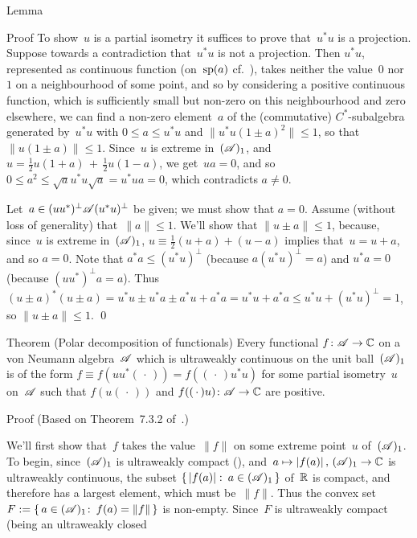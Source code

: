 \documentclass[a]{subfiles}
\begin{document}
\begin{parsec}
\begin{point}{Lemma}
\begin{point}{Proof}
To show~$u$ is a partial isometry
it suffices to prove that~$u^*u$ is a projection.
Suppose towards a contradiction that~$u^*u$ is not a projection.
Then $u^*u$,
represented
as continuous function (on~$\mathrm{sp}(a)$ cf.~),
takes neither the value~$0$ nor~$1$ on a neighbourhood
of some point,
and so by considering a
positive continuous function,
which is sufficiently small but non-zero on this neighbourhood
and zero elsewhere, 
we can find a non-zero element~$a$ 
of the (commutative) $C^*$-subalgebra generated by~$u^*u$
with $0\leq a\leq u^*u$
and $\|u^*u (1\pm a)^2\|\leq 1$,
so that~$\|u(1\pm a)\|\leq 1$.
Since~$u$ is extreme in~$(\mathscr{A})_1$,
and~$u=\frac{1}{2}u(1+a)\,+\,\frac{1}{2}u(1-a)$,
we get~$ua=0$,
and so $0\leq a^2\leq \sqrt{a}u^*u\sqrt{a}=u^*ua=0$,
which contradicts $a\neq 0$.

Let~$a\in (uu^*)^\perp \mathscr{A} (u^*u)^\perp$
be given; we must show that $a=0$.
Assume (without loss of generality)
that~$\|a\|\leq 1$.
We'll show that $\|u\pm a\|\leq 1$,
because,
since~$u$ is extreme in~$(\mathscr{A})_1$,
$u\equiv \frac{1}{2}(u+a)+(u-a)$
implies that~$u=u+a$, and so $a=0$.
Note that $a^*a \leq (u^*u)^\perp$ (because $a(u^*u)^\perp=a$)
and $u^*a = 0$ (because $(uu^*)^\perp a=a$).
Thus $(u\pm a)^*(u\pm a)
=u^*u \pm u^* a \pm a^* u + a^*a
= u^*u + a^*a \leq u^*u + (u^*u)^\perp = 1$,
so $\|u\pm a\|\leq 1$. \qed
\end{point}
\end{point}
\begin{point}%
	{Theorem (Polar decomposition of functionals)}%
Every functional $f\colon \mathscr{A}\to \mathbb{C}$ on a von Neumann algebra~$\mathscr{A}$
which is ultraweakly continuous on
the unit ball~$(\mathscr{A})_1$
is of the form $f\equiv f(uu^*(\,\cdot\,)) = f((\,\cdot\,)u^*u)$
for some partial isometry~$u$ on~$\mathscr{A}$
such that $f(u(\,\cdot\,))$
and $f((\,\cdot\,)u)\colon \mathscr{A}\to\mathbb{C}$
are positive.
\begin{point}{Proof}%
(Based on Theorem~7.3.2 of~\cite{kr}.) 
\begin{point}%
We'll first show that~$f$ takes the value~$\|f\|$
on some extreme point~$u$ of~$(\mathscr{A})_1$.
To begin, since~$(\mathscr{A})_1$ is ultraweakly compact (),
and~$a\mapsto \left|f(a)\right|,\,(\mathscr{A})_1\to\mathbb{C}$ 
is ultraweakly continuous,
the subset $\{\,\left|f(a)\right|\colon\,a\in(\mathscr{A})_1\,\}$
of~$\mathbb{R}$ is compact,
and therefore has a largest element, 
which must be~$\|f\|$.
Thus the convex
set~$F:=\{\,a\in(\mathscr{A})_1\colon\, f(a)=\|f\|\,\}$
is non-empty.
Since~$F$ is ultraweakly compact (being an ultraweakly closed

\end{point}
\end{point}
\end{point}
\end{parsec}
\end{document}
